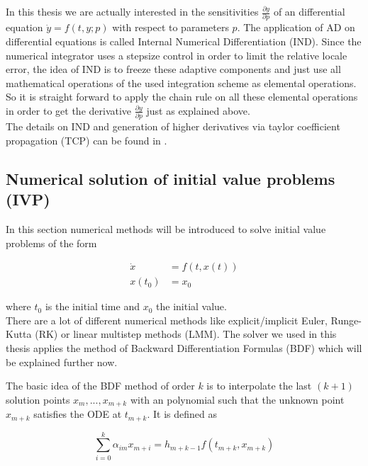 \documentclass{scrartcl}[12pt, halfparskip]
\numberwithin{equation}{section}
\numberwithin{figure}{section}
\numberwithin{table}{section}
\begin{document}
In this thesis we are actually interested in the sensitivities $\frac{\partial y}{\partial p}$ of an differential equation $\dot{y}=f(t,y;p)$ with respect to parameters $p$. The application of AD on differential equations is called Internal Numerical Differentiation (IND). Since the numerical integrator uses a stepsize control in order to limit the relative locale error, the idea of IND is to freeze these adaptive components and just use all mathematical operations of the used integration scheme as elemental operations. So it is straight forward to apply the chain rule on all these elemental operations in order to get the derivative $\frac{\partial y}{\partial p}$ just as explained above. \\
The details on IND and generation of higher derivatives via taylor coefficient propagation (TCP) can be found in \cite{diss_jan}.


\subsection{Numerical solution of initial value problems (IVP)}
In this section numerical methods will be introduced to solve initial value problems of the form

\begin{align}
	\dot{x} & = f(t,x(t)) \\
	x(t_0) & = x_0 \nonumber
\end{align}

where $t_0$ is the initial time and $x_0$ the initial value. \\

There are a lot of different numerical methods like explicit/implicit Euler, Runge-Kutta (RK) or linear multistep methods (LMM). The solver we used in this thesis applies the method of Backward Differentiation Formulas (BDF) which will be explained further now.

The basic idea of the BDF method of order $k$ is to interpolate the last $(k+1)$ solution points $x_m,...,x_{m+k}$ with an polynomial such that the unknown point $x_{m+k}$ satisfies the ODE at $t_{m+k}$. 
It is defined as

\begin{equation}
	\sum_{i=0}^{k} \alpha_{im} x_{m+i} = h_{m+k-1} f(t_{m+k},x_{m+k})
	\label{eq:bdf_formula}
\end{equation}
\end{document}
